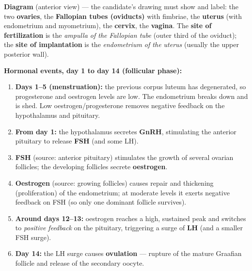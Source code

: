 \documentclass[11pt]{article}
\begin{document}
\begin{corrige}
\textbf{Diagram} (anterior view) — the candidate's drawing must show and label: the two \textbf{ovaries}, the \textbf{Fallopian tubes (oviducts)} with fimbriae, the \textbf{uterus} (with endometrium and myometrium), the \textbf{cervix}, the \textbf{vagina}. The \textbf{site of fertilization} is the \emph{ampulla of the Fallopian tube} (outer third of the oviduct); the \textbf{site of implantation} is the \emph{endometrium of the uterus} (usually the upper posterior wall).

\textbf{Hormonal events, day 1 to day 14 (follicular phase):}
\begin{enumerate}
\item \textbf{Days 1–5 (menstruation):} the previous corpus luteum has degenerated, so progesterone and oestrogen levels are low. The endometrium breaks down and is shed. Low oestrogen/progesterone removes negative feedback on the hypothalamus and pituitary.
\item \textbf{From day 1:} the hypothalamus secretes \textbf{GnRH}, stimulating the anterior pituitary to release \textbf{FSH} (and some LH).
\item \textbf{FSH} (source: anterior pituitary) stimulates the growth of several ovarian follicles; the developing follicles secrete \textbf{oestrogen}.
\item \textbf{Oestrogen} (source: growing follicles) causes repair and thickening (proliferation) of the endometrium; at moderate levels it exerts negative feedback on FSH (so only one dominant follicle survives).
\item \textbf{Around days 12–13:} oestrogen reaches a high, sustained peak and switches to \emph{positive feedback} on the pituitary, triggering a surge of \textbf{LH} (and a smaller FSH surge).
\item \textbf{Day 14:} the LH surge causes \textbf{ovulation} — rupture of the mature Graafian follicle and release of the secondary oocyte.
\end{enumerate}
\end{corrige}
\end{document}
